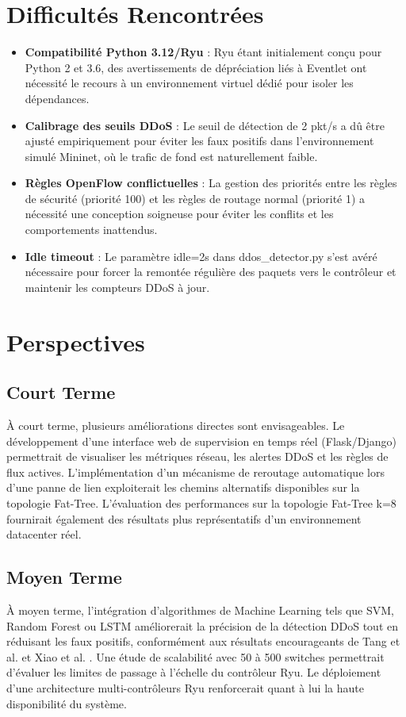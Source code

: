 \documentclass[12pt,a4paper]{report}
\begin{document}
\section{Difficultés Rencontrées}

\begin{itemize}
    \item \textbf{Compatibilité Python 3.12/Ryu} : Ryu
    étant initialement conçu pour Python 2 et 3.6,
    des avertissements de dépréciation liés à Eventlet
    ont nécessité le recours à un environnement virtuel
    dédié pour isoler les dépendances.
    \item \textbf{Calibrage des seuils DDoS} : Le seuil
    de détection de 2 pkt/s a dû être ajusté
    empiriquement pour éviter les faux positifs dans
    l'environnement simulé Mininet, où le trafic de
    fond est naturellement faible.
    \item \textbf{Règles OpenFlow conflictuelles} : La
    gestion des priorités entre les règles de sécurité
    (priorité 100) et les règles de routage normal
    (priorité 1) a nécessité une conception soigneuse
    pour éviter les conflits et les comportements
    inattendus.
    \item \textbf{Idle timeout} : Le paramètre idle=2s
    dans ddos\_detector.py s'est avéré nécessaire pour
    forcer la remontée régulière des paquets vers le
    contrôleur et maintenir les compteurs DDoS à jour.
\end{itemize}

\section{Perspectives}

\subsection{Court Terme}
À court terme, plusieurs améliorations directes sont
envisageables. Le développement d'une interface web de
supervision en temps réel (Flask/Django) permettrait de
visualiser les métriques réseau, les alertes DDoS et les
règles de flux actives. L'implémentation d'un mécanisme
de reroutage automatique lors d'une panne de lien
exploiterait les chemins alternatifs disponibles sur la
topologie Fat-Tree. L'évaluation des performances sur
la topologie Fat-Tree k=8 fournirait également des
résultats plus représentatifs d'un environnement
datacenter réel.

\subsection{Moyen Terme}
À moyen terme, l'intégration d'algorithmes de Machine
Learning tels que SVM, Random Forest ou LSTM améliorerait
la précision de la détection DDoS tout en réduisant les
faux positifs, conformément aux résultats encourageants
de Tang et al. \cite{tang2020ddos} et Xiao et al.
\cite{xiao2021deep}. Une étude de scalabilité avec 50
à 500 switches permettrait d'évaluer les limites de
passage à l'échelle du contrôleur Ryu. Le déploiement
d'une architecture multi-contrôleurs Ryu renforcerait
quant à lui la haute disponibilité du système.
\end{document}
